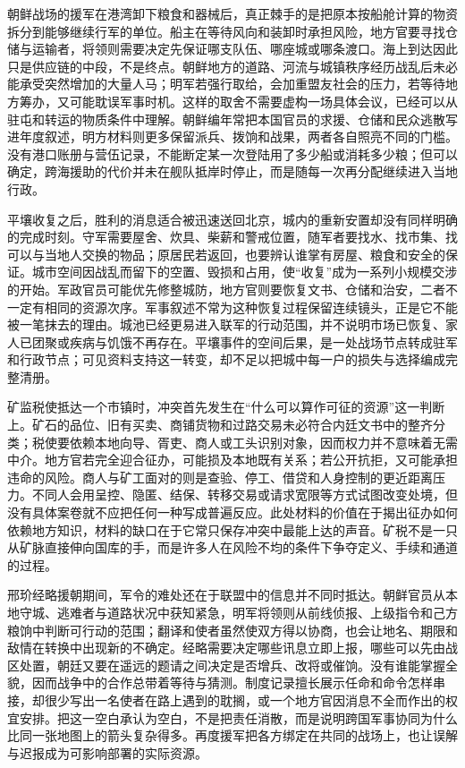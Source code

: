 朝鲜战场的援军在港湾卸下粮食和器械后，真正棘手的是把原本按船舱计算的物资拆分到能够继续行军的单位。船主在等待风向和装卸时承担风险，地方官要寻找仓储与运输者，将领则需要决定先保证哪支队伍、哪座城或哪条渡口。海上到达因此只是供应链的中段，不是终点。朝鲜地方的道路、河流与城镇秩序经历战乱后未必能承受突然增加的大量人马；明军若强行取给，会加重盟友社会的压力，若等待地方筹办，又可能耽误军事时机。这样的取舍不需要虚构一场具体会议，已经可以从驻屯和转运的物质条件中理解。朝鲜编年常把本国官员的求援、仓储和民众逃散写进年度叙述，明方材料则更多保留派兵、拨饷和战果，两者各自照亮不同的门槛。没有港口账册与营伍记录，不能断定某一次登陆用了多少船或消耗多少粮；但可以确定，跨海援助的代价并未在舰队抵岸时停止，而是随每一次再分配继续进入当地行政。

平壤收复之后，胜利的消息适合被迅速送回北京，城内的重新安置却没有同样明确的完成时刻。守军需要屋舍、炊具、柴薪和警戒位置，随军者要找水、找市集、找可以与当地人交换的物品；原居民若返回，也要辨认谁掌有房屋、粮食和安全的保证。城市空间因战乱而留下的空置、毁损和占用，使“收复”成为一系列小规模交涉的开始。军政官员可能优先修整城防，地方官则要恢复文书、仓储和治安，二者不一定有相同的资源次序。军事叙述不常为这种恢复过程保留连续镜头，正是它不能被一笔抹去的理由。城池已经更易进入联军的行动范围，并不说明市场已恢复、家人已团聚或疾病与饥饿不再存在。平壤事件的空间后果，是一处战场节点转成驻军和行政节点；可见资料支持这一转变，却不足以把城中每一户的损失与选择编成完整清册。

矿监税使抵达一个市镇时，冲突首先发生在“什么可以算作可征的资源”这一判断上。矿石的品位、旧有买卖、商铺货物和过路交易未必符合内廷文书中的整齐分类；税使要依赖本地向导、胥吏、商人或工头识别对象，因而权力并不意味着无需中介。地方官若完全迎合征办，可能损及本地既有关系；若公开抗拒，又可能承担违命的风险。商人与矿工面对的则是查验、停工、借贷和人身控制的更近距离压力。不同人会用呈控、隐匿、结保、转移交易或请求宽限等方式试图改变处境，但没有具体案卷就不应把任何一种写成普遍反应。此处材料的价值在于揭出征办如何依赖地方知识，材料的缺口在于它常只保存冲突中最能上达的声音。矿税不是一只从矿脉直接伸向国库的手，而是许多人在风险不均的条件下争夺定义、手续和通道的过程。

邢玠经略援朝期间，军令的难处还在于联盟中的信息并不同时抵达。朝鲜官员从本地守城、逃难者与道路状况中获知紧急，明军将领则从前线侦报、上级指令和己方粮饷中判断可行动的范围；翻译和使者虽然使双方得以协商，也会让地名、期限和敌情在转换中出现新的不确定。经略需要决定哪些讯息立即上报，哪些可以先由战区处置，朝廷又要在遥远的题请之间决定是否增兵、改将或催饷。没有谁能掌握全貌，因而战争中的合作总带着等待与猜测。制度记录擅长展示任命和命令怎样串接，却很少写出一名使者在路上遇到的耽搁，或一个地方官因消息不全而作出的权宜安排。把这一空白承认为空白，不是把责任消散，而是说明跨国军事协同为什么比同一张地图上的箭头复杂得多。再度援军把各方绑定在共同的战场上，也让误解与迟报成为可影响部署的实际资源。

